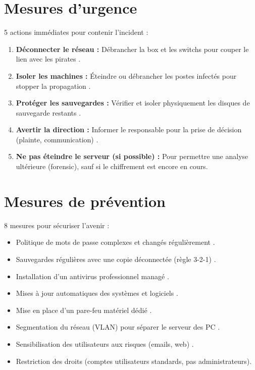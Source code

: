 \documentclass[a4paper,12pt]{article}
\begin{document}
\section{Mesures d'urgence}
5 actions immédiates pour contenir l'incident :

\begin{enumerate}
    \item \textbf{Déconnecter le réseau :} Débrancher la box et les switchs pour couper le lien avec les pirates .
    \item \textbf{Isoler les machines :} Éteindre ou débrancher les postes infectés pour stopper la propagation .
    \item \textbf{Protéger les sauvegardes :} Vérifier et isoler physiquement les disques de sauvegarde restants .
    \item \textbf{Avertir la direction :} Informer le responsable pour la prise de décision (plainte, communication) .
    \item \textbf{Ne pas éteindre le serveur (si possible) :} Pour permettre une analyse ultérieure (forensic), sauf si le chiffrement est encore en cours.
\end{enumerate}

\section{Mesures de prévention}
8 mesures pour sécuriser l'avenir :

\begin{itemize}
    \item Politique de mots de passe complexes et changés régulièrement .
    \item Sauvegardes régulières avec une copie déconnectée (règle 3-2-1) .
    \item Installation d'un antivirus professionnel managé .
    \item Mises à jour automatiques des systèmes et logiciels .
    \item Mise en place d'un pare-feu matériel dédié .
    \item Segmentation du réseau (VLAN) pour séparer le serveur des PC .
    \item Sensibilisation des utilisateurs aux risques (emails, web) .
    \item Restriction des droits (comptes utilisateurs standards, pas administrateurs).
\end{itemize}

\newpage
\end{document}
